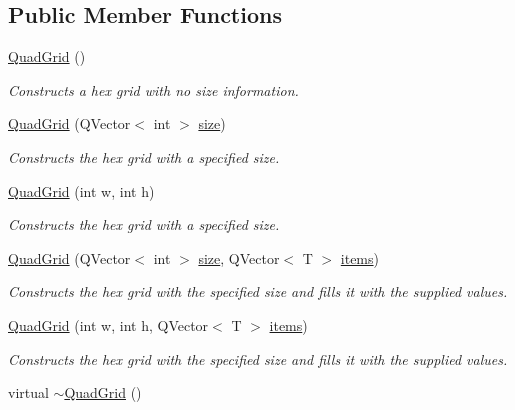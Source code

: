 \subsection*{\-Public \-Member \-Functions}
\begin{DoxyCompactItemize}
\item 
\hypertarget{classhsom_1_1_quad_grid_a6b20b45657281184ac54ed0bda4ad088}{\hyperlink{classhsom_1_1_quad_grid_a6b20b45657281184ac54ed0bda4ad088}{\-Quad\-Grid} ()}\label{classhsom_1_1_quad_grid_a6b20b45657281184ac54ed0bda4ad088}

\begin{DoxyCompactList}\small\item\em \-Constructs a hex grid with no size information. \end{DoxyCompactList}\item 
\hyperlink{classhsom_1_1_quad_grid_a0cec637e161240b9a7241ac83d0c6ff4}{\-Quad\-Grid} (\-Q\-Vector$<$ int $>$ \hyperlink{classhsom_1_1_grid_a3e846473299eb2c7c259659eb61a6234}{size})
\begin{DoxyCompactList}\small\item\em \-Constructs the hex grid with a specified size. \end{DoxyCompactList}\item 
\hyperlink{classhsom_1_1_quad_grid_a3aebaea9b496991fdd61026e74d013d4}{\-Quad\-Grid} (int w, int h)
\begin{DoxyCompactList}\small\item\em \-Constructs the hex grid with a specified size. \end{DoxyCompactList}\item 
\hyperlink{classhsom_1_1_quad_grid_abe9c6802339cc0fe89574c718b16cefc}{\-Quad\-Grid} (\-Q\-Vector$<$ int $>$ \hyperlink{classhsom_1_1_grid_a3e846473299eb2c7c259659eb61a6234}{size}, \-Q\-Vector$<$ \-T $>$ \hyperlink{classhsom_1_1_grid_ae6b6ffb72e86c3904e8ac21253d85a24}{items})
\begin{DoxyCompactList}\small\item\em \-Constructs the hex grid with the specified size and fills it with the supplied values. \end{DoxyCompactList}\item 
\hyperlink{classhsom_1_1_quad_grid_ab9762ecd6652451e4243bfa55d762b45}{\-Quad\-Grid} (int w, int h, \-Q\-Vector$<$ \-T $>$ \hyperlink{classhsom_1_1_grid_ae6b6ffb72e86c3904e8ac21253d85a24}{items})
\begin{DoxyCompactList}\small\item\em \-Constructs the hex grid with the specified size and fills it with the supplied values. \end{DoxyCompactList}\item 
\hypertarget{classhsom_1_1_quad_grid_abe87f9710cfe2e66b90243598928b1c0}{virtual \hyperlink{classhsom_1_1_quad_grid_abe87f9710cfe2e66b90243598928b1c0}{$\sim$\-Quad\-Grid} ()}\label{classhsom_1_1_quad_grid_abe87f9710cfe2e66b90243598928b1c0}


\end{DoxyCompactItemize}
